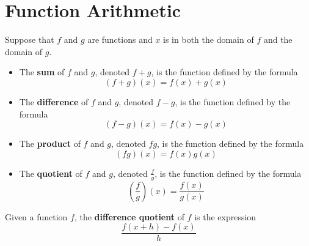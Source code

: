 \section{Function Arithmetic}

\begin{definition}
      Suppose that $f$ and $g$ are functions and $x$ is in both the domain of $f$ and the domain of $g$.
      \begin{itemize}
            \item The \textbf{sum} of $f$ and $g$, denoted $f+g$, is the function defined by the formula
                  \[(f+g)(x) = f(x) + g(x)\]
            \item The \textbf{difference} of $f$ and $g$, denoted $f-g$, is the function defined by the formula
                  \[(f-g)(x) = f(x) - g(x)\]
            \item The \textbf{product} of $f$ and $g$, denoted $fg$, is the function defined by the formula
                  \[(fg)(x) = f(x)g(x)\]
            \item The \textbf{quotient} of $f$ and $g$, denoted $\frac{f}{g}$, is the function defined by the formula
                  \[(\frac{f}{g})(x) = \frac{f(x)}{g(x)}\]
      \end{itemize}
\end{definition}

\begin{definition}
      Given a function $f$, the \textbf{difference quotient} of $f$ is the expression
      \[\frac{f(x+h)-f(x)}{h}\]
\end{definition}

